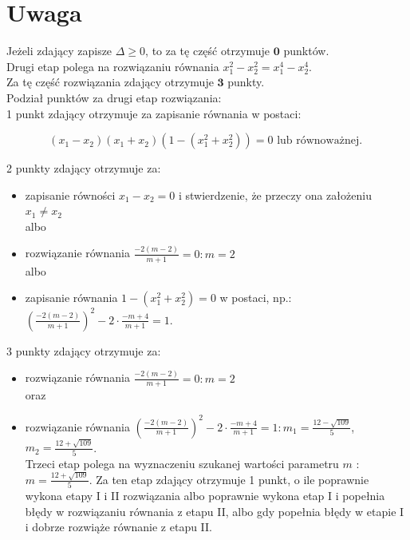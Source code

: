 \documentclass[10pt]{article}
\begin{document}
\section*{Uwaga}
Jeżeli zdający zapisze $\Delta \geq 0$, to za tę część otrzymuje $\mathbf{0}$ punktów.\\
Drugi etap polega na rozwiązaniu równania $x_{1}^{2}-x_{2}^{2}=x_{1}^{4}-x_{2}^{4}$.\\
Za tę część rozwiązania zdający otrzymuje $\mathbf{3}$ punkty.\\
Podział punktów za drugi etap rozwiązania:\\
1 punkt zdający otrzymuje za zapisanie równania w postaci:

$$
\left(x_{1}-x_{2}\right)\left(x_{1}+x_{2}\right)\left(1-\left(x_{1}^{2}+x_{2}^{2}\right)\right)=0 \text { lub równoważnej. }
$$

2 punkty zdający otrzymuje za:

\begin{itemize}
  \item zapisanie równości $x_{1}-x_{2}=0$ i stwierdzenie, że przeczy ona założeniu $x_{1} \neq x_{2}$\\
albo
  \item rozwiązanie równania $\frac{-2(m-2)}{m+1}=0: m=2$\\
albo
  \item zapisanie równania $1-\left(x_{1}^{2}+x_{2}^{2}\right)=0$ w postaci, np.: $\left(\frac{-2(m-2)}{m+1}\right)^{2}-2 \cdot \frac{-m+4}{m+1}=1$.
\end{itemize}

3 punkty zdający otrzymuje za:

\begin{itemize}
  \item rozwiązanie równania $\frac{-2(m-2)}{m+1}=0: m=2$\\
oraz
  \item rozwiązanie równania $\left(\frac{-2(m-2)}{m+1}\right)^{2}-2 \cdot \frac{-m+4}{m+1}=1: m_{1}=\frac{12-\sqrt{109}}{5}$, $m_{2}=\frac{12+\sqrt{109}}{5}$.\\
Trzeci etap polega na wyznaczeniu szukanej wartości parametru $m$ : $m=\frac{12+\sqrt{109}}{5}$. Za ten etap zdający otrzymuje 1 punkt, o ile poprawnie wykona etapy I i II rozwiązania albo poprawnie wykona etap I i popełnia błędy w rozwiązaniu równania z etapu II, albo gdy popełnia błędy w etapie I i dobrze rozwiąże równanie z etapu II.
\end{itemize}
\end{document}
